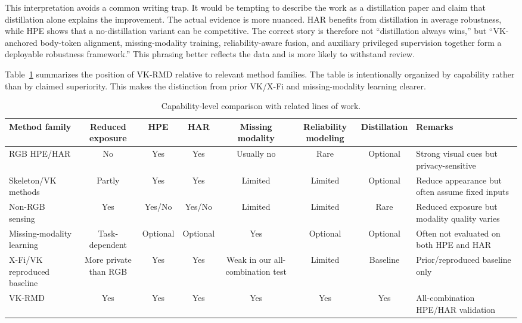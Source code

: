 \documentclass[preprint,12pt]{elsarticle}
\newcommand{\method}{VK-RMD}
\begin{document}
This interpretation avoids a common writing trap. It would be tempting to describe the work as a distillation paper and claim that distillation alone explains the improvement. The actual evidence is more nuanced. HAR benefits from distillation in average robustness, while HPE shows that a no-distillation variant can be competitive. The correct story is therefore not ``distillation always wins,'' but ``VK-anchored body-token alignment, missing-modality training, reliability-aware fusion, and auxiliary privileged supervision together form a deployable robustness framework.'' This phrasing better reflects the data and is more likely to withstand review.

Table~\ref{tab:related_work} summarizes the position of \method{} relative to relevant method families. The table is intentionally organized by capability rather than by claimed superiority. This makes the distinction from prior VK/X-Fi and missing-modality learning clearer.

\begin{table}[t]
\centering
\caption{Capability-level comparison with related lines of work.}
\label{tab:related_work}
\begin{adjustbox}{width=\textwidth}
\begin{tabular}{p{}ccccccp{}}
\toprule
Method family & Reduced exposure & HPE & HAR & Missing modality & Reliability modeling & Distillation & Remarks \\
\midrule
RGB HPE/HAR & No & Yes & Yes & Usually no & Rare & Optional & Strong visual cues but privacy-sensitive \\
Skeleton/VK methods & Partly & Yes & Yes & Limited & Limited & Optional & Reduce appearance but often assume fixed inputs \\
Non-RGB sensing & Yes & Yes/No & Yes/No & Limited & Limited & Rare & Reduced exposure but modality quality varies \\
Missing-modality learning & Task-dependent & Optional & Optional & Yes & Optional & Optional & Often not evaluated on both HPE and HAR \\
X-Fi/VK reproduced baseline & More private than RGB & Yes & Yes & Weak in our all-combination test & Limited & Baseline & Prior/reproduced baseline only \\
\method{} & Yes & Yes & Yes & Yes & Yes & Yes & All-combination HPE/HAR validation \\
\bottomrule
\end{tabular}
\end{adjustbox}
\end{table}
\end{document}

